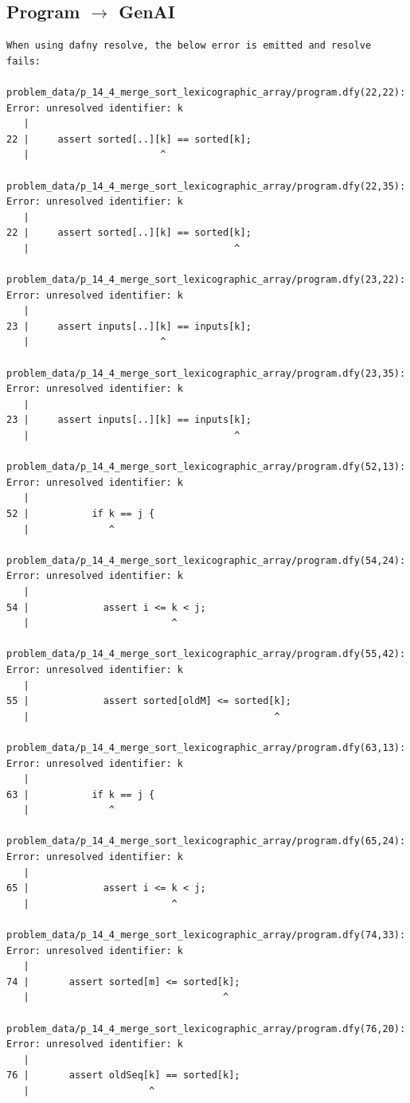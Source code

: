 \documentclass{article}
\begin{document}
\subsection*{Program $\rightarrow$ GenAI}
\begin{lstlisting}
When using dafny resolve, the below error is emitted and resolve fails:

problem_data/p_14_4_merge_sort_lexicographic_array/program.dfy(22,22): Error: unresolved identifier: k
   |
22 |     assert sorted[..][k] == sorted[k];
   |                       ^

problem_data/p_14_4_merge_sort_lexicographic_array/program.dfy(22,35): Error: unresolved identifier: k
   |
22 |     assert sorted[..][k] == sorted[k];
   |                                    ^

problem_data/p_14_4_merge_sort_lexicographic_array/program.dfy(23,22): Error: unresolved identifier: k
   |
23 |     assert inputs[..][k] == inputs[k];
   |                       ^

problem_data/p_14_4_merge_sort_lexicographic_array/program.dfy(23,35): Error: unresolved identifier: k
   |
23 |     assert inputs[..][k] == inputs[k];
   |                                    ^

problem_data/p_14_4_merge_sort_lexicographic_array/program.dfy(52,13): Error: unresolved identifier: k
   |
52 |           if k == j {
   |              ^

problem_data/p_14_4_merge_sort_lexicographic_array/program.dfy(54,24): Error: unresolved identifier: k
   |
54 |             assert i <= k < j;
   |                         ^

problem_data/p_14_4_merge_sort_lexicographic_array/program.dfy(55,42): Error: unresolved identifier: k
   |
55 |             assert sorted[oldM] <= sorted[k];
   |                                           ^

problem_data/p_14_4_merge_sort_lexicographic_array/program.dfy(63,13): Error: unresolved identifier: k
   |
63 |           if k == j {
   |              ^

problem_data/p_14_4_merge_sort_lexicographic_array/program.dfy(65,24): Error: unresolved identifier: k
   |
65 |             assert i <= k < j;
   |                         ^

problem_data/p_14_4_merge_sort_lexicographic_array/program.dfy(74,33): Error: unresolved identifier: k
   |
74 |       assert sorted[m] <= sorted[k];
   |                                  ^

problem_data/p_14_4_merge_sort_lexicographic_array/program.dfy(76,20): Error: unresolved identifier: k
   |
76 |       assert oldSeq[k] == sorted[k];
   |                     ^


\end{lstlisting}
\end{document}
